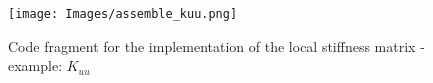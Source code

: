 \documentclass[12pt]{article}
\begin{document}
\begin{figure}[H]

	\centering
	\texttt{[image: Images/assemble\_kuu.png]}
	\caption{Code fragment for the implementation of the local stiffness matrix - example: $K_{uu}$}
		\label{fig:assemble_kuu}
\end{figure}


\newpage


\end{document}

